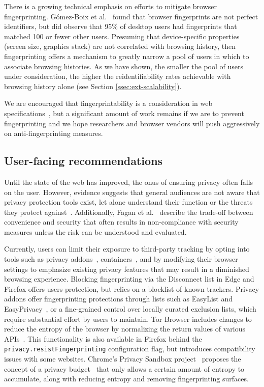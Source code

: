 \documentclass[letterpaper,twocolumn,10pt]{article}
\begin{document}
There is a growing technical emphasis on efforts to mitigate browser fingerprinting.
G\'{o}mez-Boix et al.~\cite{10.1145/3178876.3186097} found that browser fingerprints are not perfect identifiers, but did observe that 95\% of desktop users had fingerprints that matched 100 or fewer other users.
Presuming that device-specific properties (screen size, graphics stack) are not correlated with browsing history, then fingerprinting offers a mechanism to greatly narrow a pool of users in which to associate browsing histories.
As we have shown, the smaller the pool of users under consideration, the higher the reidentifiability rates achievable with browsing history alone (see Section \ref{ssec:ext-scalability}).

We are encouraged that fingerprintability is a consideration in web specifications~\cite{MitigatingBrowserFingerprintingb}, but a significant amount of work remains if we are to prevent fingerprinting and we hope researchers and browser vendors will push aggressively on anti-fingerprinting measures.
\subsection{User-facing recommendations}
\label{sec:recs}
Until the state of the web has improved, the onus of ensuring privacy often falls on the user.
However, evidence suggests that general audiences are not aware that privacy protection tools exist, let alone understand their function or the threats they protect against~\cite{ChanceryUserPerceptions}.
Additionally, Fagan et al.~\cite{faganWhyDoTheyDo} describe the trade-off between convenience and security that often results in non-compliance with security measures unless the risk can be understood and evaluated.

Currently, users can limit their exposure to third-party tracking by opting into tools such as privacy addons~\cite{frankenWhoLeftOpen2018,mathurCharacterizingUseBrowserBased2018,merzdovnikBlockMeIf2017}, containers~\cite{mozillaMultiAccountContainers}, and by modifying their browser settings to emphasize existing privacy features that may result in a diminished browsing experience. 
Blocking fingerprinting via the Disconnect list in Edge and Firefox offers users protection, but relies on a blocklist of known trackers.
Privacy addons offer fingerprinting protections through lists such as EasyList and EasyPrivacy~\cite{EasyListOverview}, or a fine-grained control over locally curated exclusion lists, which require substantial effort by users to maintain.
Tor Browser includes changes to reduce the entropy of the browser by normalizing the return values of various APIs~\cite{DesignImplementationTora}. 
This functionality is also available in Firefox behind the \texttt{privacy.resistFingerprinting} configuration flag, but introduces compatibility issues with some websites.
Chrome's Privacy Sandbox project~\cite{PrivacySandboxChromium} proposes the concept of a privacy budget~\cite{lasseyBslasseyPrivacybudget2020} that only allows a certain amount of entropy to accumulate, along with reducing entropy and removing fingerprinting surfaces. 
\end{document}
